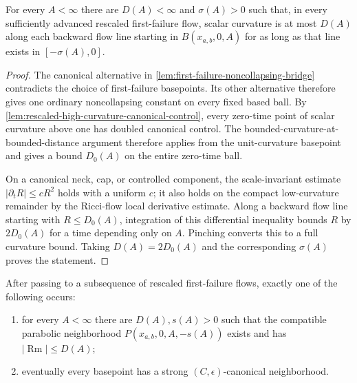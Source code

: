 \begin{lemma}
\label{lem:short-backward-curvature-control}
\notready
For every $A<\infty$ there are $D(A)<\infty$ and $\sigma(A)>0$ such that,
in every sufficiently advanced rescaled first-failure flow, scalar curvature
is at most $D(A)$ along each backward flow line starting in
$B(x_{a,b},0,A)$ for as long as that line exists in
$[-\sigma(A),0]$.
\end{lemma}

\begin{proof}
The canonical alternative in
\ref{lem:first-failure-noncollapsing-bridge} contradicts the choice of
first-failure basepoints.  Its other alternative therefore gives one
ordinary noncollapsing constant on every fixed based ball.  By
\ref{lem:rescaled-high-curvature-canonical-control}, every zero-time point
of scalar curvature above one has doubled canonical control.  The
bounded-curvature-at-bounded-distance argument therefore applies from the
unit-curvature basepoint and gives a bound $D_0(A)$ on the entire zero-time
ball.

On a canonical neck, cap, or controlled component, the scale-invariant
estimate $|\partial_tR|\le cR^2$ holds with a uniform $c$; it also holds on
the compact low-curvature remainder by the Ricci-flow local derivative
estimate.  Along a backward flow line starting with
$R\le D_0(A)$, integration of this differential inequality bounds
$R$ by $2D_0(A)$ for a time depending only on $A$.  Pinching converts this
to a full curvature bound.  Taking $D(A)=2D_0(A)$ and the corresponding
$\sigma(A)$ proves the statement.
\end{proof}

\begin{lemma}
\label{lem:backward-parabolic-neighborhood-dichotomy}
\notready
After passing to a subsequence of rescaled first-failure flows, exactly one
of the following occurs:
\begin{enumerate}
\item for every $A<\infty$ there are $D(A),s(A)>0$ such that the compatible
      parabolic neighborhood
      $P(x_{a,b},0,A,-s(A))$ exists and has
      $|\operatorname{Rm}|\le D(A)$;
\item eventually every basepoint has a strong
      $(C,\epsilon)$-canonical neighborhood.
\end{enumerate}
\end{lemma}

